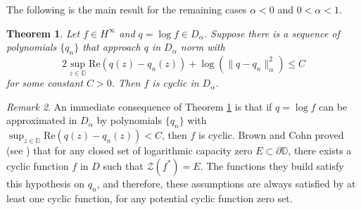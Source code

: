 \documentclass[11 pt,reqno]{amsart}
\newtheorem{thm}{Theorem}[section]
\theoremstyle{definition}
\theoremstyle{remark}
\newtheorem{rem}[thm]{Remark}
\numberwithin{equation}{section} \numberwithin{figure}{section}
\newcommand{\DD}{{\mathbb D}}
\begin{document}
The following is the main result for the remaining cases $\alpha <
0$ and $0<\alpha <1$.

\begin{thm}\label{cyclic1}
Let $f \in H^\infty$ and $q=\log f \in D_\alpha$. Suppose there is a
sequence of polynomials $\{q_n\}$ that approach $q$ in $D_\alpha$
norm with $$2 \sup_{z \in \DD} \mathrm{Re}(q(z)-q_n(z)) + \log
(\|q-q_n\|^2_\alpha) \leq C$$ for some constant $C>0$. Then $f$ is
cyclic in $D_\alpha$.
\end{thm}

\begin{rem}
An immediate consequence of Theorem \ref{cyclic1}
is that
if $q = \log f$ can be approximated in $D_{\alpha}$ by polynomials $\{q_n\}$ with $\sup_{z \in \DD}
\mathrm{Re}(q(z)-q_n(z)) < C$, then $f$ is cyclic.
Brown and Cohn proved (see \cite[Theorem B]{BC85}) that for any
closed set of logarithmic capacity zero $E \subset
\partial \DD$, there exists a cyclic function $f$ in $D$ such that
$\mathcal{Z}(f^*) =E$. The functions they build satisfy this hypothesis on $q_n$, and therefore,
these assumptions are always satisfied by
at least one cyclic function, for any potential cyclic function zero set.
\end{rem}
\end{document}
